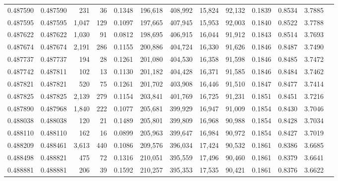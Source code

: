 \begin{tabular}{rrrrrrrrrrrrr}
0.487590 & 0.487590 &   231 &    36 &                                     0.1348 & 196,618 & 408,992 &  15,824 &  92,132 & 0.1839 & 0.8534 & 3.7885 \\
0.487595 & 0.487595 & 1,047 &   129 &                                     0.1097 & 197,665 & 407,945 &  15,953 &  92,003 & 0.1840 & 0.8522 & 3.7788 \\
0.487622 & 0.487622 & 1,030 &    91 &                                     0.0812 & 198,695 & 406,915 &  16,044 &  91,912 & 0.1843 & 0.8514 & 3.7693 \\
0.487674 & 0.487674 & 2,191 &   286 &                                     0.1155 & 200,886 & 404,724 &  16,330 &  91,626 & 0.1846 & 0.8487 & 3.7490 \\
0.487737 & 0.487737 &   194 &    28 &                                     0.1261 & 201,080 & 404,530 &  16,358 &  91,598 & 0.1846 & 0.8485 & 3.7472 \\
0.487742 & 0.487811 &   102 &    13 &                                     0.1130 & 201,182 & 404,428 &  16,371 &  91,585 & 0.1846 & 0.8484 & 3.7462 \\
0.487821 & 0.487821 &   520 &    75 &                                     0.1261 & 201,702 & 403,908 &  16,446 &  91,510 & 0.1847 & 0.8477 & 3.7414 \\
0.487825 & 0.487825 & 2,139 &   279 &                                     0.1154 & 203,841 & 401,769 &  16,725 &  91,231 & 0.1851 & 0.8451 & 3.7216 \\
0.487890 & 0.487968 & 1,840 &   222 &                                     0.1077 & 205,681 & 399,929 &  16,947 &  91,009 & 0.1854 & 0.8430 & 3.7046 \\
0.488038 & 0.488038 &   120 &    21 &                                     0.1489 & 205,801 & 399,809 &  16,968 &  90,988 & 0.1854 & 0.8428 & 3.7034 \\
0.488110 & 0.488110 &   162 &    16 &                                     0.0899 & 205,963 & 399,647 &  16,984 &  90,972 & 0.1854 & 0.8427 & 3.7019 \\
0.488209 & 0.488461 & 3,613 &   440 &                                     0.1086 & 209,576 & 396,034 &  17,424 &  90,532 & 0.1861 & 0.8386 & 3.6685 \\
0.488498 & 0.488821 &   475 &    72 &                                     0.1316 & 210,051 & 395,559 &  17,496 &  90,460 & 0.1861 & 0.8379 & 3.6641 \\
0.488881 & 0.488881 &   206 &    39 &                                     0.1592 & 210,257 & 395,353 &  17,535 &  90,421 & 0.1861 & 0.8376 & 3.6622 \\

\end{tabular}
